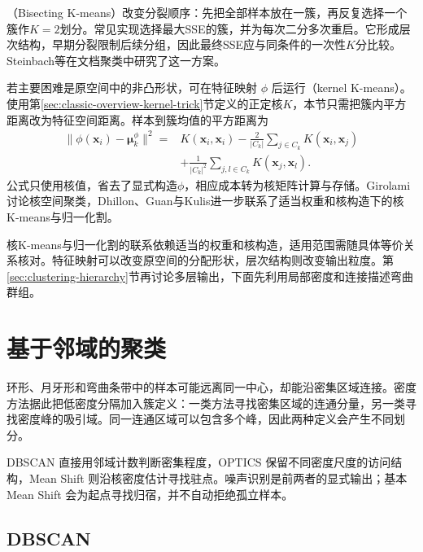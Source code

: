 （Bisecting K-means）改变分裂顺序：先把全部样本放在一簇，再反复选择一个簇作$K=2$划分。常见实现选择最大SSE的簇，并为每次二分多次重启。它形成层次结构，早期分裂限制后续分组，因此最终SSE应与同条件的一次性$K$分比较。Steinbach等在文档聚类中研究了这一方案。

\Needspace{105mm}
若主要困难是原空间中的非凸形状，可在特征映射 $\phi$ 后运行（kernel K-means）。使用第\ref{sec:classic-overview-kernel-trick}节定义的正定核$K$，本节只需把簇内平方距离改为特征空间距离。样本到簇均值的平方距离为
\begin{equation}
 \begin{aligned}
 \lVert\phi(\bm{x}_i)-\bm{\mu}_k^\phi\rVert^2
 ={}&K(\bm{x}_i,\bm{x}_i)
 -\frac{2}{|C_k|}\sum_{j\in C_k}K(\bm{x}_i,\bm{x}_j)\\
 &+\frac{1}{|C_k|^2}
   \sum_{j,l\in C_k}K(\bm{x}_j,\bm{x}_l).
 \end{aligned}
 \label{eq:clustering-kernel-kmeans}
\end{equation}
公式只使用核值，省去了显式构造$\phi$，相应成本转为核矩阵计算与存储。Girolami讨论核空间聚类，Dhillon、Guan与Kulis进一步联系了适当权重和核构造下的核K-means与归一化割。

核K-means与归一化割的联系依赖适当的权重和核构造，适用范围需随具体等价关系核对。特征映射可以改变原空间的分配形状，层次结构则改变输出粒度。第\ref{sec:clustering-hierarchy}节再讨论多层输出，下面先利用局部密度和连接描述弯曲群组。

\section{基于邻域的聚类}
\label{sec:clustering-density}

环形、月牙形和弯曲条带中的样本可能远离同一中心，却能沿密集区域连接。密度方法据此把低密度分隔加入簇定义：一类方法寻找密集区域的连通分量，另一类寻找密度峰的吸引域。同一连通区域可以包含多个峰，因此两种定义会产生不同划分。

DBSCAN 直接用邻域计数判断密集程度，OPTICS 保留不同密度尺度的访问结构，Mean Shift 则沿核密度估计寻找驻点。噪声识别是前两者的显式输出；基本 Mean Shift 会为起点寻找归宿，并不自动拒绝孤立样本。

\subsection{DBSCAN}
\label{sec:clustering-dbscan}

